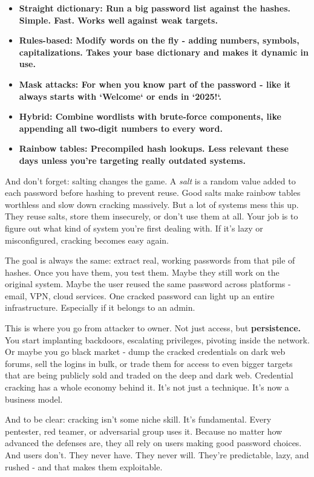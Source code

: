\begin{itemize}
    \item \textbf{\textbf{Straight dictionary: }Run a big password list against the hashes. Simple. Fast. Works well against weak targets.}
    \item \textbf{\textbf{Rules-based: }Modify words on the fly - adding numbers, symbols, capitalizations. Takes your base dictionary and makes it dynamic in use.}
    \item \textbf{\textbf{Mask attacks: }For when you know part of the password - like it always starts with `Welcome` or ends in `2025!`.}
    \item \textbf{\textbf{Hybrid: }Combine wordlists with brute-force components, like appending all two-digit numbers to every word.}
    \item \textbf{\textbf{Rainbow tables: }Precompiled hash lookups. Less relevant these days unless you’re targeting really outdated systems.}
\end{itemize}
And don’t forget: salting changes the game. A \textit{salt} is a random value added to each password before hashing to prevent reuse. Good salts make rainbow tables worthless and slow down cracking massively. But a lot of systems mess this up. They reuse salts, store them insecurely, or don’t use them at all. Your job is to figure out what kind of system you’re first dealing with. If it’s lazy or misconfigured, cracking becomes easy again.

The goal is always the same: extract real, working passwords from that pile of hashes. Once you have them, you test them. Maybe they still work on the original system. Maybe the user reused the same password across platforms - email, VPN, cloud services. One cracked password can light up an entire infrastructure. Especially if it belongs to an admin.

This is where you go from attacker to owner. Not just access, but \textbf{persistence. }You start implanting backdoors, escalating privileges, pivoting inside the network. Or maybe you go black market - dump the cracked credentials on dark web forums, sell the logins in bulk, or trade them for access to even bigger targets that are being publicly sold and traded on the deep and dark web. Credential cracking has a whole economy behind it. It’s not just a technique. It’s now a business model.

And to be clear: cracking isn’t some niche skill. It’s fundamental. Every pentester, red teamer, or adversarial group uses it. Because no matter how advanced the defenses are, they all rely on users making good password choices. And users don’t. They never have. They never will. They’re predictable, lazy, and rushed - and that makes them exploitable.


